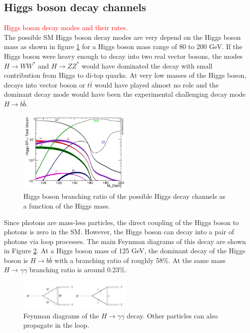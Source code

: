 \subsection{Higgs boson decay channels}
\label{chap1:EWSB:HD}
\textcolor{red}{Higgs boson decay modes and their rates. \\}
The possible SM Higgs boson decay modes are very depend on the Higgs boson mass as shown in figure \ref{fig:chap1:EWSB:BR} for a Higgs boson mass range of 80 to 200 GeV. If the Higgs boson were heavy enough to decay into two real vector bosons, the modes $H\rightarrow WW^*$ and $ H\rightarrow ZZ^*$ would have dominated the decay with small contribution from Higgs to di-top quarks. At very low masses of the Higgs boson, decays into vector boson or $t\bar{t}$ would have played almost no role and the dominant decay mode would have been the experimental challenging decay mode $H\rightarrow b\bar{b}$.
\begin{figure}[h!]
    \centering
    \includegraphics[width=0.5\textwidth]{Ch1/Img/Higgs_Br.png}
    \caption{Higgs boson branching ratio of the possible Higgs decay channels as a function of the Higgs mass.}
    \label{fig:chap1:EWSB:BR}
\end{figure}
Since photons are mass-less particles, the direct coupling of the Higgs boson to photons is zero in the SM. However, the Higgs boson can decay into a pair of photons via loop processes. The main Feynman diagrams of this decay are shown in Figure \ref{fig:chap1:EWSB:Hgg}. 
At a Higgs boson mass of 125 GeV, the dominant decay of the Higgs boson is $H \rightarrow b\bar{b}$ with a branching ratio of roughly 58\%. At the same mass $H\rightarrow\gamma\gamma$ branching ratio is around 0.23\%.
\begin{figure}[ht]
    \centering
    \includegraphics[width=0.5\textwidth]{Ch1/Img/H_to_gammagamma.png}
    \caption{Feynman diagrams of the $H\rightarrow\gamma\gamma$ decay. Other particles can also propagate in the loop.}
    \label{fig:chap1:EWSB:Hgg}
\end{figure}

